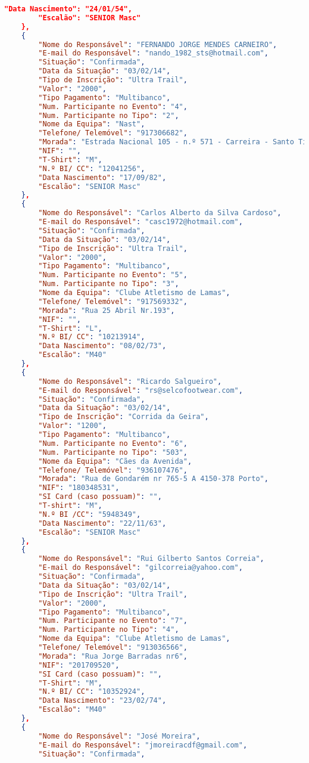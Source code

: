 \documentclass[11pt,a4paper]{report}
\begin{document}
\begin{lstlisting}[language=json,firstnumber=1]
		"Data Nascimento": "24/01/54",
		"Escalão": "SENIOR Masc"
	},
	{
		"Nome do Responsável": "FERNANDO JORGE MENDES CARNEIRO",
		"E-mail do Responsável": "nando_1982_sts@hotmail.com",
		"Situação": "Confirmada",
		"Data da Situação": "03/02/14",
		"Tipo de Inscrição": "Ultra Trail",
		"Valor": "2000",
		"Tipo Pagamento": "Multibanco",
		"Num. Participante no Evento": "4",
		"Num. Participante no Tipo": "2",
		"Nome da Equipa": "Nast",
		"Telefone/ Telemóvel": "917306682",
		"Morada": "Estrada Nacional 105 - n.º 571 - Carreira - Santo Tirso",
		"NIF": "",
		"T-Shirt": "M",
		"N.º BI/ CC": "12041256",
		"Data Nascimento": "17/09/82",
		"Escalão": "SENIOR Masc"
	},
	{
		"Nome do Responsável": "Carlos Alberto da Silva Cardoso",
		"E-mail do Responsável": "casc1972@hotmail.com",
		"Situação": "Confirmada",
		"Data da Situação": "03/02/14",
		"Tipo de Inscrição": "Ultra Trail",
		"Valor": "2000",
		"Tipo Pagamento": "Multibanco",
		"Num. Participante no Evento": "5",
		"Num. Participante no Tipo": "3",
		"Nome da Equipa": "Clube Atletismo de Lamas",
		"Telefone/ Telemóvel": "917569332",
		"Morada": "Rua 25 Abril Nr.193",
		"NIF": "",
		"T-Shirt": "L",
		"N.º BI/ CC": "10213914",
		"Data Nascimento": "08/02/73",
		"Escalão": "M40"
	},
	{
		"Nome do Responsável": "Ricardo Salgueiro",
		"E-mail do Responsável": "rs@selcofootwear.com",
		"Situação": "Confirmada",
		"Data da Situação": "03/02/14",
		"Tipo de Inscrição": "Corrida da Geira",
		"Valor": "1200",
		"Tipo Pagamento": "Multibanco",
		"Num. Participante no Evento": "6",
		"Num. Participante no Tipo": "503",
		"Nome da Equipa": "Cães da Avenida",
		"Telefone/ Telemóvel": "936107476",
		"Morada": "Rua de Gondarém nr 765-5 A 4150-378 Porto",
		"NIF": "180348531",
		"SI Card (caso possuam)": "",
		"T-shirt": "M",
		"N.º BI /CC": "5948349",
		"Data Nascimento": "22/11/63",
		"Escalão": "SENIOR Masc"
	},
	{
		"Nome do Responsável": "Rui Gilberto Santos Correia",
		"E-mail do Responsável": "gilcorreia@yahoo.com",
		"Situação": "Confirmada",
		"Data da Situação": "03/02/14",
		"Tipo de Inscrição": "Ultra Trail",
		"Valor": "2000",
		"Tipo Pagamento": "Multibanco",
		"Num. Participante no Evento": "7",
		"Num. Participante no Tipo": "4",
		"Nome da Equipa": "Clube Atletismo de Lamas",
		"Telefone/ Telemóvel": "913036566",
		"Morada": "Rua Jorge Barradas nr6",
		"NIF": "201709520",
		"SI Card (caso possuam)": "",
		"T-Shirt": "M",
		"N.º BI/ CC": "10352924",
		"Data Nascimento": "23/02/74",
		"Escalão": "M40"
	},
	{
		"Nome do Responsável": "José Moreira",
		"E-mail do Responsável": "jmoreiracdf@gmail.com",
		"Situação": "Confirmada",

\end{lstlisting}
\end{document}

